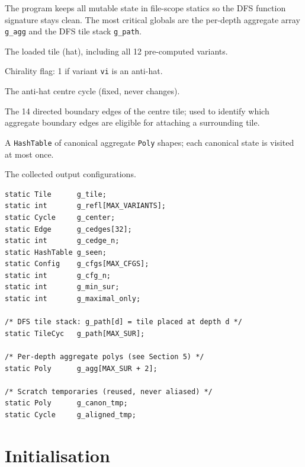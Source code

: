 \documentclass[10pt,a4paper]{article}
\let\polysection\section
\renewcommand\section{\needspace{0.16\textheight}\polysection}
\newcommand{\code}[1]{\texttt{\small #1}}
\begin{document}
\begin{tcolorbox}[dualbox, title={Global Variables}]
  The program keeps all mutable state in file-scope statics so the
  DFS function signature stays clean.  The most critical globals are
  the per-depth aggregate array \code{g\_agg} and the DFS tile stack
  \code{g\_path}.

  \medskip
  \begin{description}[leftmargin=0pt, style=nextline]
    \item[\code{g\_tile}]
      The loaded tile (hat), including all 12 pre-computed variants.
    \item[\code{g\_refl[vi]}]
      Chirality flag: 1 if variant \code{vi} is an anti-hat.
    \item[\code{g\_center}]
      The anti-hat centre cycle (fixed, never changes).
    \item[\code{g\_cedges[\,]}, \code{g\_cedge\_n}]
      The 14 directed boundary edges of the centre tile; used to
      identify which aggregate boundary edges are eligible for
      attaching a surrounding tile.
    \item[\code{g\_seen}]
      A \code{HashTable} of canonical aggregate \code{Poly} shapes;
      each canonical state is visited at most once.
    \item[\code{g\_cfgs[\,]}, \code{g\_cfg\_n}]
      The collected output configurations.
  \end{description}
\tcblower
\begin{verbatim}
static Tile      g_tile;
static int       g_refl[MAX_VARIANTS];
static Cycle     g_center;
static Edge      g_cedges[32];
static int       g_cedge_n;
static HashTable g_seen;
static Config    g_cfgs[MAX_CFGS];
static int       g_cfg_n;
static int       g_min_sur;
static int       g_maximal_only;

/* DFS tile stack: g_path[d] = tile placed at depth d */
static TileCyc   g_path[MAX_SUR];

/* Per-depth aggregate polys (see Section 5) */
static Poly      g_agg[MAX_SUR + 2];

/* Scratch temporaries (reused, never aliased) */
static Poly      g_canon_tmp;
static Cycle     g_aligned_tmp;
\end{verbatim}
\end{tcolorbox}

\section{Initialisation}
\end{document}
